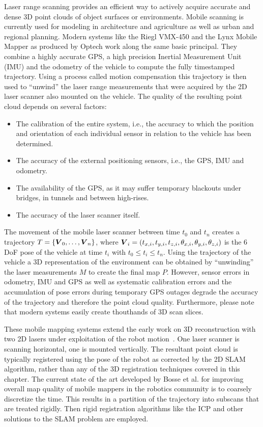 \documentclass[twocolumn,oneside]{book}
\newcommand{\V}[1]{\vector{#1}}  %
\begin{document}
Laser range scanning provides an efficient way to actively acquire
accurate and dense 3D point clouds of object surfaces or
environments. Mobile scanning is currently used for modeling in
architecture and agriculture as well as urban and regional planning.
Modern systems like the Riegl VMX-450 and the Lynx Mobile Mapper as
produced by Optech work along the same basic principal. They combine a
highly accurate GPS, a high precision Inertial Measurement Unit (IMU)
and the odometry of the vehicle to compute the fully timestamped
trajectory.  Using a process called motion compensation this
trajectory is then used to ``unwind'' the laser range measurements
that were acquired by the 2D laser scanner also mounted on the
vehicle.  The quality of the resulting point cloud depends on several
factors:
\begin{itemize}
  \item The calibration of the entire system, i.e., the accuracy to
    which the position and orientation of each individual sensor in
    relation to the vehicle has been determined.
  \item The accuracy of the external positioning sensors, i.e., the
    GPS, IMU and odometry.
  \item The availability of the GPS, as it may suffer temporary
    blackouts under bridges, in tunnels and between high-rises.
  \item The accuracy of the laser scanner itself.
\end{itemize}
The movement of the mobile laser scanner between time $t_0$ and $t_n$
creates a trajectory $T = \{ \V V_0, \dots, \V V_n\}$, where $\V V_i=
(t_{x,i}, t_{y,i}, t_{z,i}, \theta_{x,i}, \theta_{y,i}, \theta_{z,i})$
is the 6 DoF pose of the vehicle at time $t_i$ with $t_0 \leq t_i \leq
t_n$.  Using the trajectory of the vehicle a 3D representation of the
environment can be obtained by ``unwinding'' the laser measurements
$M$ to create the final map $P$. However, sensor errors in odometry,
IMU and GPS as well as systematic calibration errors and the
accumulation of pose errors during temporary GPS outages degrade the
accuracy of the trajectory and therefore the point cloud
quality. Furthermore, please note that modern systems easily create
thouthands of 3D scan slices.

These mobile mapping systems extend the early work on 3D
reconstruction with two 2D lasers under exploitation of the robot
motion~\cite{thrun00}. One laser scanner is scanning horizontal, one
is mounted vertically. The resultant point cloud is typically
registered using the pose of the robot as corrected by the 2D SLAM
algorithm, rather than any of the 3D registration techniques covered
in this chapter. The current state of the art developed by Bosse et
al. \cite{Bosse:2012} for improving overall map quality of mobile
mappers in the robotics community is to coarsely discretize the
time. This results in a partition of the trajectory into subscans that
are treated rigidly. Then rigid registration algorithms like the ICP
and other solutions to the SLAM problem are employed.
\end{document}
